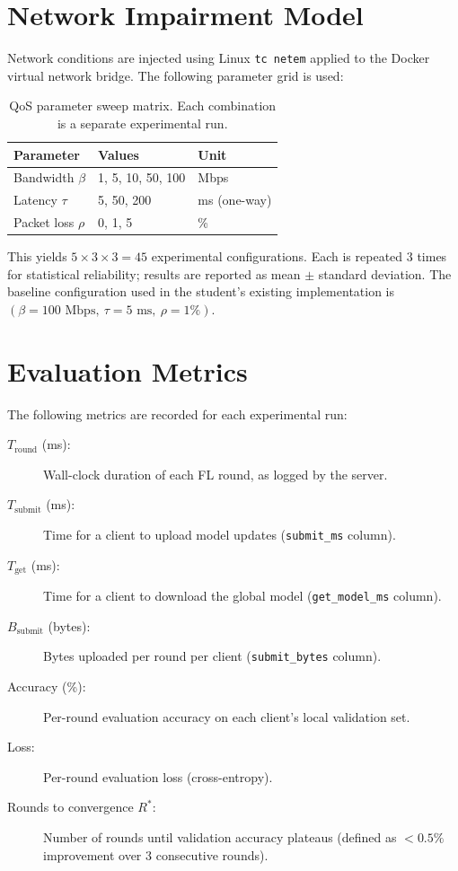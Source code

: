\documentclass[12pt,a4paper]{report}
\begin{document}
\section{Network Impairment Model}

Network conditions are injected using Linux \texttt{tc netem} applied to the Docker virtual network bridge. The following parameter grid is used:

\begin{table}[H]
\centering
\caption{QoS parameter sweep matrix. Each combination is a separate experimental run.}
\label{tab:sweep}
\begin{tabular}{lll}
\toprule
Parameter & Values & Unit \\
\midrule
Bandwidth $\beta$ & 1, 5, 10, 50, 100 & Mbps \\
Latency $\tau$ & 5, 50, 200 & ms (one-way) \\
Packet loss $\rho$ & 0, 1, 5 & \% \\
\bottomrule
\end{tabular}
\end{table}

This yields $5 \times 3 \times 3 = 45$ experimental configurations. Each is repeated 3 times for statistical reliability; results are reported as mean $\pm$ standard deviation. The baseline configuration used in the student's existing implementation is $(\beta=100\text{ Mbps},\ \tau=5\text{ ms},\ \rho=1\%)$.

\section{Evaluation Metrics}

The following metrics are recorded for each experimental run:

\begin{description}
  \item[$T_{\mathrm{round}}$ (ms):] Wall-clock duration of each FL round, as logged by the server.
  \item[$T_{\mathrm{submit}}$ (ms):] Time for a client to upload model updates (\texttt{submit\_ms} column).
  \item[$T_{\mathrm{get}}$ (ms):] Time for a client to download the global model (\texttt{get\_model\_ms} column).
  \item[$B_{\mathrm{submit}}$ (bytes):] Bytes uploaded per round per client (\texttt{submit\_bytes} column).
  \item[Accuracy (\%):] Per-round evaluation accuracy on each client's local validation set.
  \item[Loss:] Per-round evaluation loss (cross-entropy).
  \item[Rounds to convergence $R^*$:] Number of rounds until validation accuracy plateaus (defined as $< 0.5\%$ improvement over 3 consecutive rounds).
\end{description}
\end{document}
